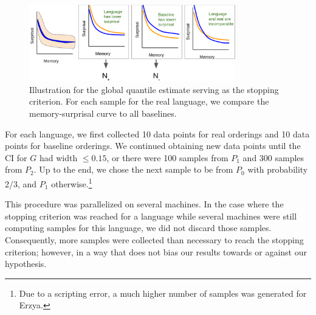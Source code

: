 \begin{figure}
	\begin{center}
\includegraphics[width=0.8\textwidth]{figures/quantile-global.png}
\end{center}
	\caption{Illustration for the global quantile estimate serving as the stopping criterion. For each sample for the real language, we compare the memory-surprisal curve to all baselines.}\label{fig:quantile-global}
\end{figure}


For each language, we first collected 10 data points for real orderings and 10 data points for baseline orderings.
We continued obtaining new data points until the CI for $G$ had width $\leq 0.15$, or there were 100 samples from $P_1$ and 300 samples from $P_2$.
Up to the end, we chose the next sample to be from $P_0$ with probability 2/3, and $P_1$ otherwise.\footnote{Due to a scripting error, a much higher number of samples was generated for Erzya.}

This procedure was parallelized on several machines.
In the case where the stopping criterion was reached for a language while several machines were still computing samples for this language, we did not discard those samples.
Consequently, more samples were collected than necessary to reach the stopping criterion; however, in a way that does not bias our results towards or against our hypothesis.





